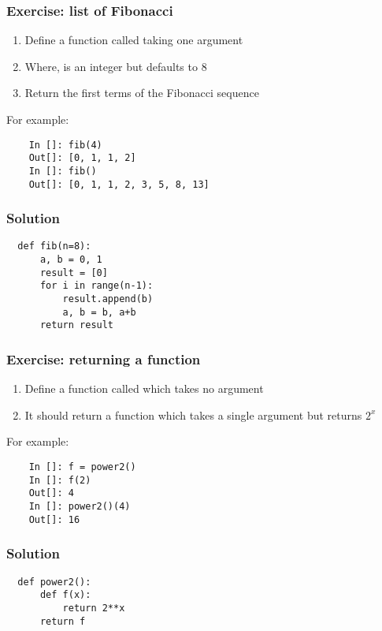 \documentclass[14pt,compress]{beamer}
\begin{document}
\begin{frame}
  \frametitle{Exercise: list of Fibonacci}
  \begin{enumerate}
  \item Define a function called  taking one argument 
  \item Where,  is an integer but defaults to 8
  \item Return the first  terms of the Fibonacci sequence
  \end{enumerate}
  For example:
  \begin{lstlisting}
    In []: fib(4)
    Out[]: [0, 1, 1, 2]
    In []: fib()
    Out[]: [0, 1, 1, 2, 3, 5, 8, 13]
  \end{lstlisting}
\end{frame}

\begin{frame}
\frametitle{Solution}
\begin{lstlisting}
  def fib(n=8):
      a, b = 0, 1
      result = [0]
      for i in range(n-1):
          result.append(b)
          a, b = b, a+b
      return result
\end{lstlisting}
\end{frame}

\begin{frame}
  \frametitle{Exercise: returning a function}
  \begin{enumerate}
  \item Define a function called  which takes no argument
  \item It should return a function which takes a single argument  but
    returns $2^x$
  \end{enumerate}
  For example:
  \begin{lstlisting}
    In []: f = power2()
    In []: f(2)
    Out[]: 4
    In []: power2()(4)
    Out[]: 16
  \end{lstlisting}
\end{frame}

\begin{frame}
\frametitle{Solution}
\begin{lstlisting}
  def power2():
      def f(x):
          return 2**x
      return f
\end{lstlisting}
\end{frame}
\end{document}

